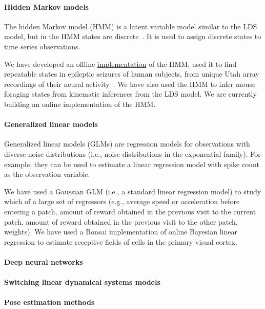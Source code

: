 \paragraph{Hidden Markov models}

The hidden Markov model (HMM) is a latent variable model similar to the LDS
model, but in the HMM states are discrete~\citep[][Chapter 13]{bishop06}. It is
used to assign discrete states to time series observations.

We have developed an offline
\href{https://github.com/joacorapela/hiddenMarkovModels}{implementation} of the
HMM, used it to find repeatable states in epileptic seizures of human subjects,
from unique Utah array recordings of their neural
activity~\citep{rapelaAndTodorovToBeSubmitted}. We have also used the HMM to
infer mouse foraging states from kinematic inferences from the LDS model. We
are currently building an online implementation of the HMM.

\paragraph{Generalized linear models}

Generalized linear models (GLMs) are regression models for observations with diverse
noise distributions (i.e., noise distributions in the exponential family). For
example, they can be used to estimate a linear regression model with spike
count as the observation variable.

We have used a Gaussian GLM (i.e., a standard linear regression model) to
study which of a large set of regressors (e.g., average speed or acceleration
before entering a patch, amount of reward obtained in the previous visit to the
current patch, amount of reward obtained in the previous visit to the other
patch, weights). We have used a Bonsai implementation of online Bayesian linear
regression to estimate receptive fields of cells in the primary visual
cortex.

\paragraph{Deep neural networks}

\paragraph{Switching linear dynamical systems models}

\paragraph{Pose estimation methods}

